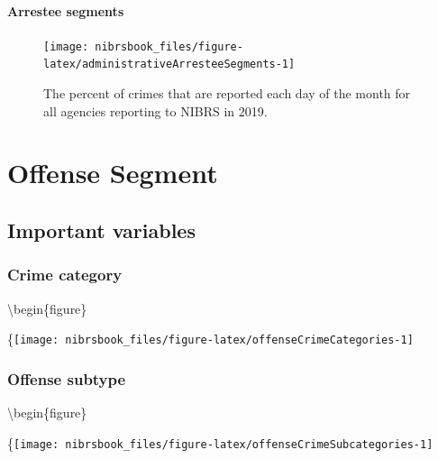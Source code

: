 \documentclass[
  12pt,
  openany]{book}
\begin{document}
\hypertarget{arrestee-segments}{%
\subsubsection{Arrestee segments}\label{arrestee-segments}}

\begin{figure}

{\centering \texttt{[image: nibrsbook\_files/figure-latex/administrativeArresteeSegments-1]} 

}

\caption{The percent of crimes that are reported each day of the month for all agencies reporting to NIBRS in 2019.}\label{fig:administrativeArresteeSegments}
\end{figure}

\hypertarget{offense-segment}{%
\chapter{Offense Segment}\label{offense-segment}}

\hypertarget{important-variables-1}{%
\section{Important variables}\label{important-variables-1}}

\hypertarget{crime-category}{%
\subsection{Crime category}\label{crime-category}}

\textbackslash begin\{figure\}

\{\centering \texttt{[image: nibrsbook\_files/figure-latex/offenseCrimeCategories-1]}

\hypertarget{offense-subtype}{%
\subsection{Offense subtype}\label{offense-subtype}}

\textbackslash begin\{figure\}

\{\centering \texttt{[image: nibrsbook\_files/figure-latex/offenseCrimeSubcategories-1]}
\end{document}
